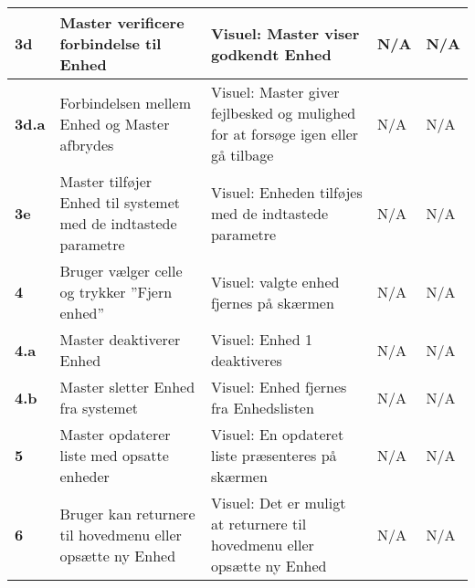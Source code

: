 \begin{center}
\begin{longtable}{|p{}|p{}|p{}|p{}|p{}|}
\textbf{3d}&Master verificere forbindelse til Enhed
			&Visuel: Master viser godkendt Enhed
			&N/A 
			&N/A \\\hline 
			
\textbf{3d.a}&Forbindelsen mellem Enhed og Master afbrydes
			&Visuel: Master giver fejlbesked og mulighed for at forsøge igen eller gå tilbage
			&N/A 
			&N/A \\\hline
					
\textbf{3e}&Master tilføjer Enhed til systemet med de indtastede parametre
			&Visuel: Enheden tilføjes med de indtastede parametre
			&N/A 
			&N/A \\\hline
						
\textbf{4}	&Bruger vælger celle og trykker ''Fjern enhed'' 
			&Visuel: valgte enhed fjernes på skærmen 
			&N/A 
			&N/A \\\hline
			 
\textbf{4.a}&Master deaktiverer Enhed
			&Visuel: Enhed 1 deaktiveres
			&N/A 
			&N/A \\\hline
			
\textbf{4.b}&Master sletter Enhed fra systemet
			&Visuel: Enhed fjernes fra Enhedslisten 
			&N/A 
			&N/A \\\hline
			 
\textbf{5}	&Master opdaterer liste med opsatte enheder 
			&Visuel: En opdateret liste præsenteres på skærmen 
			&N/A 
			&N/A \\\hline
			 
\textbf{6}	&Bruger kan returnere til hovedmenu eller opsætte ny Enhed
			&Visuel: Det er muligt at returnere til hovedmenu eller opsætte ny Enhed
			&N/A
			&N/A \\\hline

\end{longtable}
	\label{ATUC1} 
\end{center}